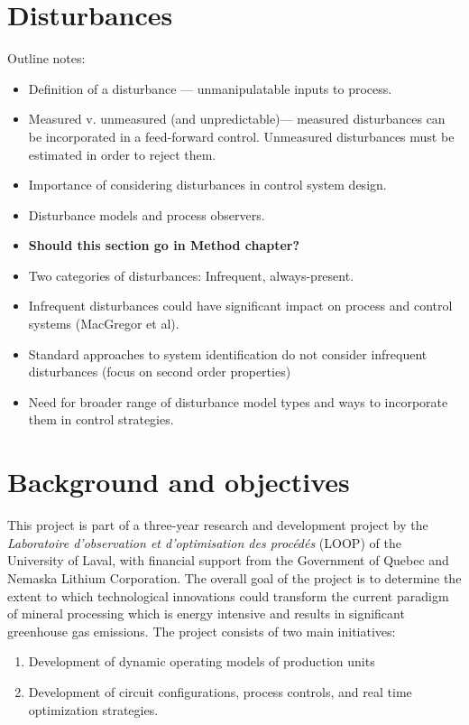 \section*{Disturbances}

Outline notes:

\begin{itemize}
	\item Definition of a disturbance — unmanipulatable inputs to process.
	\item Measured v. unmeasured (and unpredictable)— measured disturbances can be incorporated in a feed-forward control.  Unmeasured disturbances must be estimated in order to reject them.
	\item Importance of considering disturbances in control system design.
	\item Disturbance models and process observers.
	\item \textbf{Should this section go in Method chapter?}
	\item Two categories of disturbances: Infrequent, always-present.
	\item Infrequent disturbances could have significant impact on process and control systems (MacGregor et al).
	\item Standard approaches to system identification do not consider infrequent disturbances (focus on second order properties)
	\item Need for broader range of disturbance model types and ways to incorporate them in control strategies.
\end{itemize}

\section*{Background and objectives}

This project is part of a three-year research and development project by the \textit{Laboratoire d’observation et d’optimisation des procédés} (LOOP) of the University of Laval, with financial support from the Government of Quebec and Nemaska Lithium Corporation. The overall goal of the project is to determine the extent to which technological innovations could transform the current paradigm of mineral processing which is energy intensive and results in significant greenhouse gas emissions. The project consists of two main initiatives:

\begin{enumerate}
	\item Development of dynamic operating models of production units
	\item Development of circuit configurations, process controls, and real time optimization strategies.
\end{enumerate}

